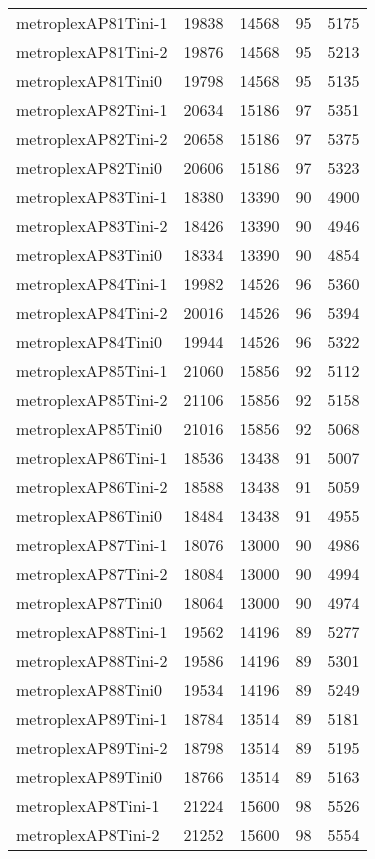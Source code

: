 \begin{longtable}{lrrrr}
metroplexAP81Tini-1 & 19838 & 14568 & 95 & 5175 \\
metroplexAP81Tini-2 & 19876 & 14568 & 95 & 5213 \\
metroplexAP81Tini0 & 19798 & 14568 & 95 & 5135 \\
metroplexAP82Tini-1 & 20634 & 15186 & 97 & 5351 \\
metroplexAP82Tini-2 & 20658 & 15186 & 97 & 5375 \\
metroplexAP82Tini0 & 20606 & 15186 & 97 & 5323 \\
metroplexAP83Tini-1 & 18380 & 13390 & 90 & 4900 \\
metroplexAP83Tini-2 & 18426 & 13390 & 90 & 4946 \\
metroplexAP83Tini0 & 18334 & 13390 & 90 & 4854 \\
metroplexAP84Tini-1 & 19982 & 14526 & 96 & 5360 \\
metroplexAP84Tini-2 & 20016 & 14526 & 96 & 5394 \\
metroplexAP84Tini0 & 19944 & 14526 & 96 & 5322 \\
metroplexAP85Tini-1 & 21060 & 15856 & 92 & 5112 \\
metroplexAP85Tini-2 & 21106 & 15856 & 92 & 5158 \\
metroplexAP85Tini0 & 21016 & 15856 & 92 & 5068 \\
metroplexAP86Tini-1 & 18536 & 13438 & 91 & 5007 \\
metroplexAP86Tini-2 & 18588 & 13438 & 91 & 5059 \\
metroplexAP86Tini0 & 18484 & 13438 & 91 & 4955 \\
metroplexAP87Tini-1 & 18076 & 13000 & 90 & 4986 \\
metroplexAP87Tini-2 & 18084 & 13000 & 90 & 4994 \\
metroplexAP87Tini0 & 18064 & 13000 & 90 & 4974 \\
metroplexAP88Tini-1 & 19562 & 14196 & 89 & 5277 \\
metroplexAP88Tini-2 & 19586 & 14196 & 89 & 5301 \\
metroplexAP88Tini0 & 19534 & 14196 & 89 & 5249 \\
metroplexAP89Tini-1 & 18784 & 13514 & 89 & 5181 \\
metroplexAP89Tini-2 & 18798 & 13514 & 89 & 5195 \\
metroplexAP89Tini0 & 18766 & 13514 & 89 & 5163 \\
metroplexAP8Tini-1 & 21224 & 15600 & 98 & 5526 \\
metroplexAP8Tini-2 & 21252 & 15600 & 98 & 5554 \\

\end{longtable}
